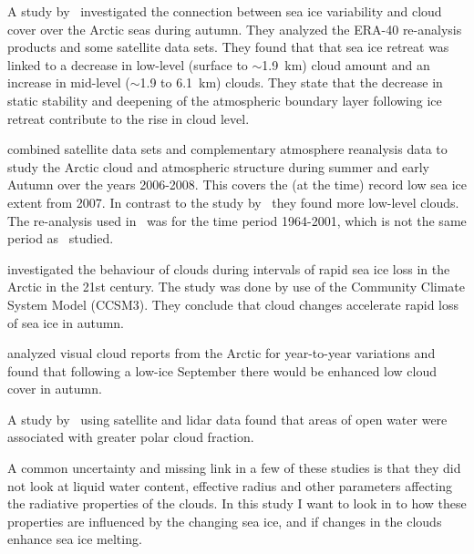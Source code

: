 A study by~\citet{Schweiger2008} investigated the connection between sea ice variability and cloud cover over the Arctic seas during autumn. They analyzed the ERA-40 re-analysis products and some satellite data sets. %
They found that that sea ice retreat was linked to a decrease in low-level (surface to $\sim$1.9~km) cloud amount and an increase in mid-level ($\sim$1.9 to 6.1~km) clouds. They state that the decrease in static stability and deepening of the atmospheric boundary layer following ice retreat contribute to the rise in cloud level. 
 
\citet{Kay2009} combined satellite data sets and complementary atmosphere reanalysis data to study the Arctic cloud and atmospheric structure during summer and early Autumn over the years 2006-2008. This covers the (at the time) record low sea ice extent from 2007. In contrast to the study by~\citet{Schweiger2008} they found more low-level clouds. The re-analysis used in~\citet{Schweiger2008} was for the time period 1964-2001, which is not the same period as~\citet{Kay2009} studied. %

\citet{Vavrus2010} investigated the behaviour of clouds during intervals of rapid sea ice loss in the Arctic in the 21st century. The study was done by use of the Community Climate System Model (CCSM3). They conclude that cloud changes accelerate rapid loss of sea ice in autumn. %

\citet{Eastman2010a} analyzed visual cloud reports from the Arctic for year-to-year variations and found that following a low-ice September there would be enhanced low cloud cover in autumn.

A study by~\citet{Palm2010} using satellite and lidar data  found that areas of open water were associated with greater polar cloud fraction.

A common uncertainty and missing link in a few of these studies is that they did not look at liquid water content, effective radius and other parameters affecting the radiative properties of the clouds. In this study I want to look in to how these properties are influenced by the changing sea ice, and if changes in the clouds enhance sea ice melting.

